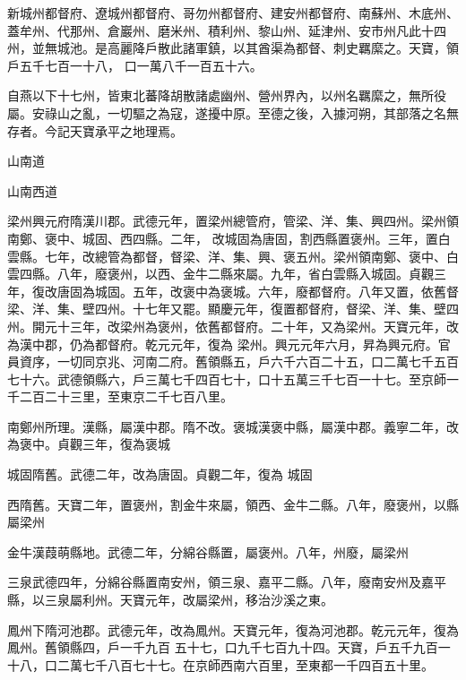 \begin{pinyinscope}
 新城州都督府、遼城州都督府、哥勿州都督府、建安州都督府、南蘇州、木底州、蓋牟州、代那州、倉巖州、磨米州、積利州、黎山州、延津州、安市州凡此十四州，並無城池。是高麗降戶散此諸軍鎮，以其酋渠為都督、刺史羈縻之。天寶，領戶五千七百一十八，
 口一萬八千一百五十六。



 自燕以下十七州，皆東北蕃降胡散諸處幽州、營州界內，以州名羈縻之，無所役屬。安祿山之亂，一切驅之為寇，遂擾中原。至德之後，入據河朔，其部落之名無存者。今記天寶承平之地理焉。



 山南道



 山南西道



 梁州興元府隋漢川郡。武德元年，置梁州總管府，管梁、洋、集、興四州。梁州領南鄭、褒中、城固、西四縣。二年，
 改城固為唐固，割西縣置褒州。三年，置白雲縣。七年，改總管為都督，督梁、洋、集、興、褒五州。梁州領南鄭、褒中、白雲四縣。八年，廢褒州，以西、金牛二縣來屬。九年，省白雲縣入城固。貞觀三年，復改唐固為城固。五年，改褒中為褒城。六年，廢都督府。八年又置，依舊督梁、洋、集、壁四州。十七年又罷。顯慶元年，復置都督府，督梁、洋、集、壁四州。開元十三年，改梁州為褒州，依舊都督府。二十年，又為梁州。天寶元年，改為漢中郡，仍為都督府。乾元元年，復為
 梁州。興元元年六月，昇為興元府。官員資序，一切同京兆、河南二府。舊領縣五，戶六千六百二十五，口二萬七千五百七十六。武德領縣六，戶三萬七千四百七十，口十五萬三千七百一十七。至京師一千二百二十三里，至東京二千七百八里。



 南鄭州所理。漢縣，屬漢中郡。隋不改。褒城漢褒中縣，屬漢中郡。義寧二年，改為褒中。貞觀三年，復為褒城



 城固隋舊。武德二年，改為唐固。貞觀二年，復為
 城固



 西隋舊。天寶二年，置褒州，割金牛來屬，領西、金牛二縣。八年，廢褒州，以縣屬梁州



 金牛漢葭萌縣地。武德二年，分綿谷縣置，屬褒州。八年，州廢，屬梁州



 三泉武德四年，分綿谷縣置南安州，領三泉、嘉平二縣。八年，廢南安州及嘉平縣，以三泉屬利州。天寶元年，改屬梁州，移治沙溪之東。



 鳳州下隋河池郡。武德元年，改為鳳州。天寶元年，復為河池郡。乾元元年，復為鳳州。舊領縣四，戶一千九百
 五十七，口九千七百九十四。天寶，戶五千九百一十八，口二萬七千八百七十七。在京師西南六百里，至東都一千四百五十里。




\end{pinyinscope}
